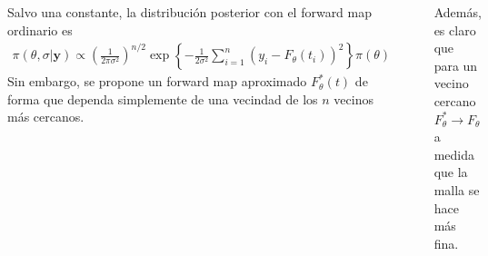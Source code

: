 \documentclass[20pt,margin=1in,innermargin=-4.5in,blockverticalspace=-0.25in]{tikzposter}
\begin{document}
\begin{columns}
{        Salvo una constante, la distribución posterior con el forward map ordinario es 
        \begin{align*}
            \pi(\theta, \sigma|\mathbf{y}) \propto \left(\frac{1}{2\pi \sigma^2}\right) ^{n/2}\exp \left \{  -\frac{1}{2\sigma^2}\sum_{i = 1}^{n} \left(y_i - F_{\theta}(t_i)\right)^2 \right \} \pi(\theta)
        \end{align*}
        Sin embargo, se propone un forward map aproximado $F_{\theta}^{*}(t)$ de forma que dependa simplemente de una vecindad de los $n$ vecinos más cercanos.

        \begin{center}
            \includegraphics[width = 15cm]{figuras/5.png}
        \end{center}

        Además, es claro que para un vecino cercano $F^{*}_{\theta}\rightarrow F_{\theta}$ a medida que la malla se hace más fina.

    
    }

    
\end{columns}
\end{document}
